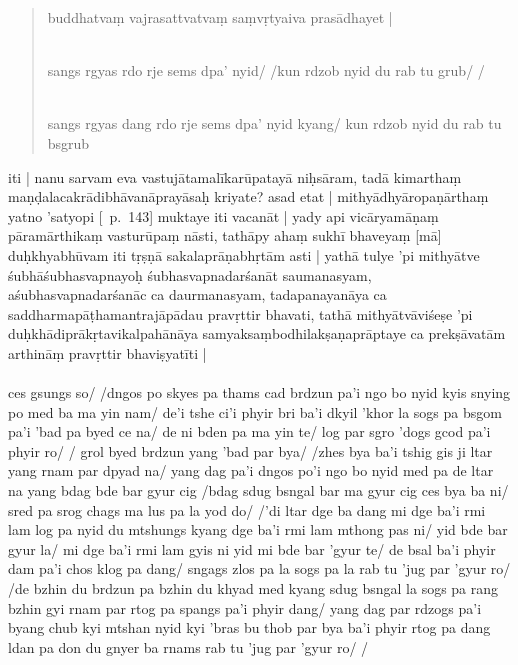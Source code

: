 \documentclass[12pt]{article}
\begin{document}
\begin{quote}
	buddhatvaṃ vajrasattvatvaṃ saṃvṛtyaiva prasādhayet |

	\textbf{\TVA}\\
	sangs rgyas rdo rje sems dpa' nyid/ /kun rdzob nyid du rab tu grub/ /

	\textbf{\TVB}\\
	sangs rgyas dang rdo rje sems dpa' nyid kyang/ kun rdzob nyid du rab tu bsgrub
\end{quote}

iti | nanu sarvam eva vastujātamalīkarūpatayā niḥsāram, tadā kimarthaṃ maṇḍalacakrādibhāvanāprayāsaḥ kriyate? asad etat | mithyādhyāropaṇārthaṃ yatno 'satyopi [\EDD\ p.\ 143] muktaye iti vacanāt | yady api vicāryamāṇaṃ pāramārthikaṃ vasturūpaṃ nāsti, tathāpy ahaṃ sukhī bhaveyaṃ [mā] duḥkhyabhūvam iti tṛṣṇā sakalaprāṇabhṛtām asti | yathā tulye 'pi mithyātve śubhāśubhasvapnayoḥ śubhasvapnadarśanāt saumanasyam, aśubhasvapnadarśanāc ca daurmanasyam, tadapanayanāya ca saddharmapāṭhamantrajāpādau pravṛttir bhavati, tathā mithyātvāviśeṣe 'pi duḥkhādiprākṛtavikalpahānāya samyaksaṃbodhilakṣaṇaprāptaye ca prekṣāvatām arthināṃ pravṛttir bhaviṣyatīti |\\

\textbf{\TVA}\\
ces gsungs so/ /dngos po skyes pa thams cad brdzun pa'i ngo bo nyid kyis snying po med ba ma yin nam/ de'i tshe ci'i phyir bri ba'i dkyil 'khor la sogs pa bsgom pa'i 'bad pa byed ce na/ de ni bden pa ma yin te/ log par sgro 'dogs gcod pa'i phyir ro/ / grol byed brdzun yang 'bad par bya/ /zhes bya ba'i tshig gis ji ltar yang rnam par dpyad na/ yang dag pa'i dngos po'i ngo bo nyid med pa de ltar na yang bdag bde bar gyur cig /bdag sdug bsngal bar ma gyur cig ces bya ba ni/ sred pa srog chags ma lus pa la yod do/ /'di ltar dge ba dang mi dge ba'i rmi lam log pa nyid du mtshungs kyang dge ba'i rmi lam mthong pas ni/ yid bde bar gyur la/ mi dge ba'i rmi lam gyis ni yid mi bde bar 'gyur te/ de bsal ba'i phyir dam pa'i chos klog pa dang/ sngags zlos pa la sogs pa la rab tu 'jug par 'gyur ro/ /de bzhin du brdzun pa bzhin du khyad med kyang sdug bsngal la sogs pa rang bzhin gyi rnam par rtog pa spangs pa'i phyir dang/ yang dag par rdzogs pa'i byang chub kyi mtshan nyid kyi 'bras bu thob par bya ba'i phyir rtog pa dang ldan pa don du gnyer ba rnams rab tu 'jug par 'gyur ro/ /\\
\end{document}
